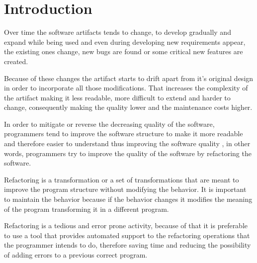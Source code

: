 
% 
% 

\section{Introduction}

Over time the software artifacts tends to change, to develop gradually and expand %
 while being used and even during developing new requirements appear, the existing ones change, new bugs are found or some critical %
  new features are created.

Because of these changes the artifact starts to drift apart from it's original design in order to incorporate all those modifications.
That increases the complexity of the artifact making it less readable, more difficult to extend and harder to change, consequently making the quality lower and the maintenance costs higher. %


In order to mitigate or reverse the decreasing quality of the software, programmers tend to improve the software structure to make it more readable and therefore easier to understand thus improving the software quality \cite{bourquin2007high}, in other words, programmers try to improve the quality of the software by refactoring the software. %

Refactoring is a transformation or a set of transformations that are meant to improve the program structure without modifying the behavior. 
It is important to maintain the behavior because if the behavior changes it modifies the meaning of the program transforming it in a different program.


Refactoring is a tedious and error prone activity, because of that it is preferable to use a tool that provides automated support to the refactoring operations that the programmer intends to do, therefore saving time and reducing the possibility of adding errors to a previous correct program.


